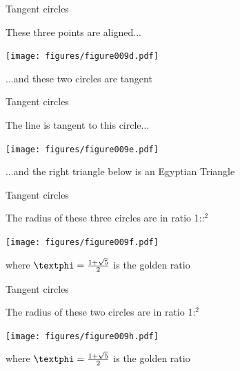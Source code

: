 \documentclass[14pt]{beamer}
\begin{document}
    \begin{frame}{Tangent circles}
        \begin{center}
            These three points are aligned...
        \end{center}
        \hspace{3.92em} \texttt{[image: figures/figure009d.pdf]} \\
        \begin{center}
             ...and these two circles are tangent
        \end{center}
    \end{frame}


    \begin{frame}{Tangent circles}
        \begin{center}
            The line is tangent to this circle...
        \end{center}
        \hspace{6.18em} \texttt{[image: figures/figure009e.pdf]} \\
        \begin{center}
             ...and the right triangle below is an Egyptian Triangle
        \end{center}
    \end{frame}


    \begin{frame}{Tangent circles}
        \begin{center}
            The radius of these three circles are in ratio 1:\textphi:\textphi$^2$
        \end{center}\medskip
        \hspace{6.18em} \texttt{[image: figures/figure009f.pdf]} \\
        \begin{center}
             where $\text{\textphi} =\tfrac{1+\sqrt{5}}{2}$ is the golden ratio
        \end{center}
    \end{frame}


    \begin{frame}{Tangent circles}
        \begin{center}
            The radius of these two circles are in ratio 1:\textphi$^2$
        \end{center}\medskip
        \hspace{6.18em} \texttt{[image: figures/figure009h.pdf]} \\
        \begin{center}
             where $\text{\textphi} =\tfrac{1+\sqrt{5}}{2}$ is the golden ratio
        \end{center}
    \end{frame}
\end{document}
